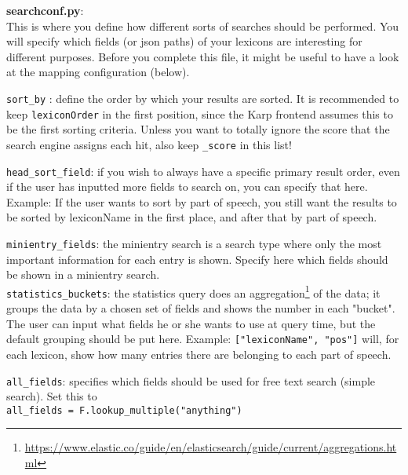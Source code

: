 \documentclass[
12pt, %
a4paper, %
oneside, %
headinclude,footinclude, %
BCOR0mm, %
]{scrartcl}
\begin{document}
\textbf{searchconf.py}:\\
   This is where you define how different sorts of searches should be performed.
   You will specify which fields (or json paths) of your lexicons are interesting
   for different purposes.
   Before you complete this file, it might be useful to have a look at the mapping
   configuration (below).

   \verb|sort_by| : define the order by which your results are sorted. It is recommended
             to keep \verb|lexiconOrder| in the first position,
             since the Karp frontend assumes this to be the first sorting criteria.
             Unless you want
             to totally ignore the score that the search
             engine assigns each hit, also keep \verb|_score| in this list!

   \verb|head_sort_field|: if you wish to always have a specific primary result order,
             even if the user has inputted more fields to search on, you can specify that
             here. Example: If the user wants to sort by part of speech, you still want
             the results to be sorted by lexiconName in the first place, and after that
             by part of speech.

   \verb|minientry_fields|: the minientry search is a search type where only the most
             important information for each entry is shown. Specify here which
             fields should be shown in a minientry search.\\
  \verb|statistics_buckets|: the statistics query does an
             aggregation\footnote{\url{https://www.elastic.co/guide/en/elasticsearch/guide/current/aggregations.html}}
             of the data; it groups the data by a chosen set of fields and shows the number in each
             "bucket".
             The user can input what fields he or she wants to use at query time, but the default
             grouping should be put here.
             Example: \verb|["lexiconName", "pos"]| will, for each lexicon, show how many
             entries there are belonging to each part of speech.

  \verb|all_fields|: specifies which fields should be used for free text search (simple search).
             Set this to \\
             \verb|all_fields = F.lookup_multiple("anything")|
\end{document}
